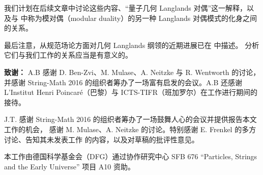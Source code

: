 我们计划在后续文章中讨论这些内容、“量子几何 Langlands 对偶”这一解释，以及与 \cite{T10}
中称为模对偶（modular duality）的另一种 Langlands 对偶模式的化身之间的关系。

最后注意，从规范场论方面对几何 Langlands 纲领的近期进展已在 \cite{Ga16a,Ga16b} 中描述。
分析它们与我们工作的关系应当是有意义的。

{\bf 致谢：}
A.B 感谢 D. Ben-Zvi、M. Mulase、A. Neitzke 与 R. Wentworth 的讨论，并感谢 String-Math 2016
的组织者筹办了一场富有启发的会议。A.B 还感谢 L'Institut Henri Poincar\'e（巴黎）与
ICTS-TIFR（班加罗尔）在工作进行期间的接待。

J.T. 感谢 String-Math 2016 的组织者筹办了一场鼓舞人心的会议并提供报告本文工作的机会，
感谢 M. Mulase、A. Neitzke 的讨论。特别感谢 E. Frenkel 的多方讨论、告知其未发表工作
\cite{Fr10} 的内容，以及对草稿的批评性意见。

本工作由德国科学基金会（DFG）通过协作研究中心 SFB 676 “Particles, Strings and the Early
Universe” 项目 A10 资助。

